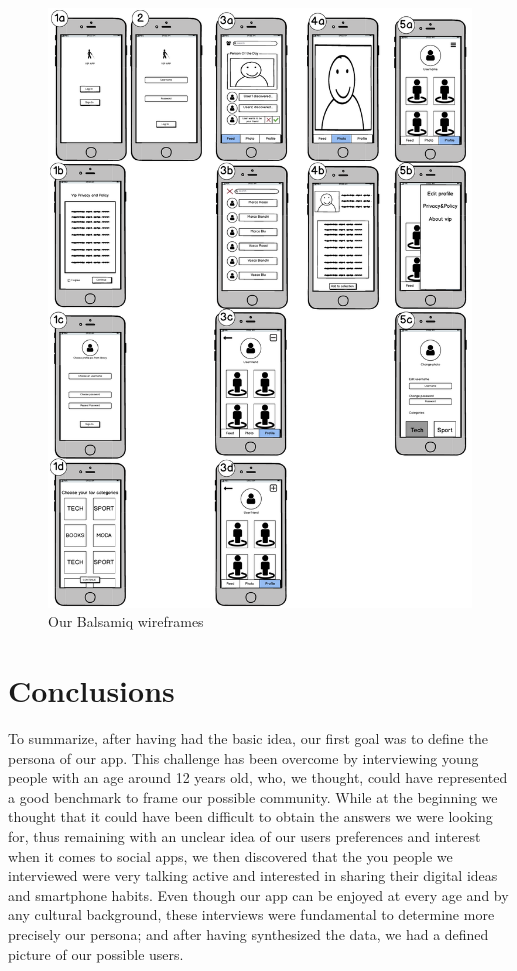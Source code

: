 \documentclass[12pt]{scrartcl}
\begin{document}
	\begin{figure}[H]
        		\centering
       		\includegraphics[width=\textwidth]{wireframes.pdf}
       		\caption{Our Balsamiq wireframes}
        		\label{wireframes}
	\end{figure}
	
	
\section{Conclusions}

	
	To summarize, after having had the basic idea, our first goal was to define the persona of our app. This challenge has been overcome by interviewing young people with an age around 12 years old, who, we thought, could have represented a good benchmark to frame our possible community. While at the beginning we thought that it could have been difficult to obtain the answers we were looking for, thus remaining with an unclear idea of our users preferences and interest when it comes to social apps, we then discovered that the you people we interviewed were very talking active and interested in sharing their digital ideas and smartphone habits. Even though our app can be enjoyed at every age and by any cultural background, these interviews were fundamental to determine more precisely our persona; and after having synthesized the data, we had a defined picture of our possible users.\\
	
\end{document}
